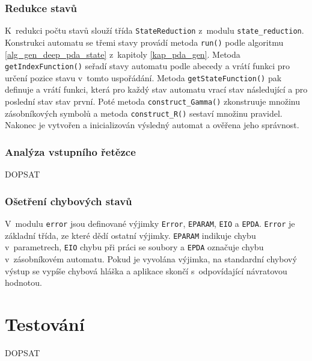 \subsubsection{Redukce stavů}

K~redukci počtu stavů slouží třída \texttt{StateReduction} z~modulu \texttt{state\_reduction}. Konstrukci automatu se třemi stavy provádí metoda \texttt{run()} podle algoritmu \ref{alg_gen_deep_pda_state} z~kapitoly \ref{kap_pda_gen}. Metoda \texttt{getIndexFunction()} seřadí stavy automatu podle abecedy a vrátí funkci pro určení pozice stavu v~tomto uspořádání. Metoda \texttt{getStateFunction()} pak definuje a vrátí funkci, která pro každý stav automatu vrací stav následující a pro poslední stav stav první. Poté metoda \texttt{construct\_Gamma()} zkonstruuje množinu zásobníkových symbolů a metoda \texttt{construct\_R()} sestaví množinu pravidel. Nakonec je vytvořen a inicializován výsledný automat a ověřena jeho správnost.

\subsubsection{Analýza vstupního řetězce}
DOPSAT

\subsubsection{Ošetření chybových stavů}

V~modulu \texttt{error} jsou definované výjimky \texttt{Error}, \texttt{EPARAM}, \texttt{EIO} a \texttt{EPDA}. \texttt{Error} je základní třída, ze které dědí ostatní výjimky. \texttt{EPARAM} indikuje chybu v~parametrech, \texttt{EIO} chybu při práci se soubory a \texttt{EPDA} označuje chybu v~zásobníkovém automatu. Pokud je vyvolána výjimka, na standardní chybový výstup se vypíše chybová hláška a aplikace skončí s~odpovídající návratovou hodnotou.

\section{Testování}
DOPSAT


